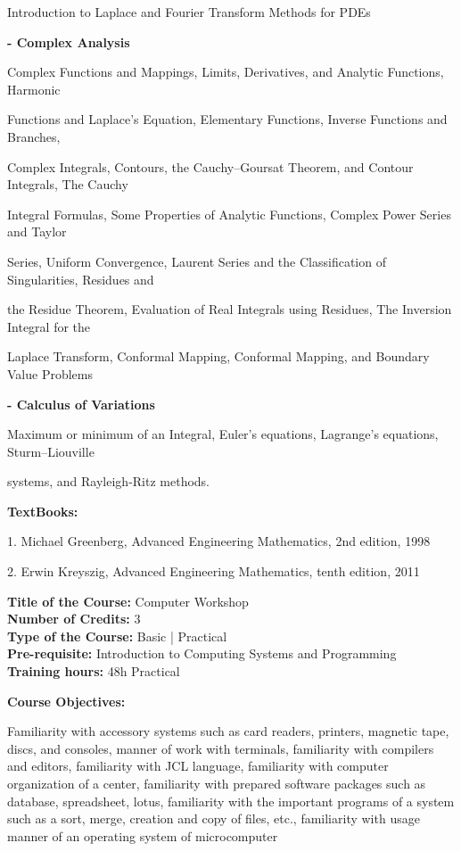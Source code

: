 \documentclass[12pt,a4paper]{article}
\begin{document}
Introduction to Laplace and Fourier Transform Methods for PDEs\par
\vspace{2pt}\textbf{- Complex Analysis}\par
Complex Functions and Mappings, Limits, Derivatives, and Analytic Functions, Harmonic\par
Functions and Laplace’s Equation, Elementary Functions, Inverse Functions and Branches,\par
Complex Integrals, Contours, the Cauchy–Goursat Theorem, and Contour Integrals, The Cauchy\par
Integral Formulas, Some Properties of Analytic Functions, Complex Power Series and Taylor\par
Series, Uniform Convergence, Laurent Series and the Classiﬁcation of Singularities, Residues and\par
the Residue Theorem, Evaluation of Real Integrals using Residues, The Inversion Integral for the\par
Laplace Transform, Conformal Mapping, Conformal Mapping, and Boundary Value Problems\par
\vspace{2pt}\textbf{- Calculus of Variations}\par
Maximum or minimum of an Integral, Euler’s equations, Lagrange’s equations, Sturm–Liouville\par
systems, and Rayleigh-Ritz methods.\par\vspace{4pt}
\textbf{TextBooks:}\par\vspace{2pt}
1. Michael Greenberg, Advanced Engineering Mathematics, 2nd edition, 1998\par
2. Erwin Kreyszig, Advanced Engineering Mathematics, tenth edition, 2011\par
\vspace{4pt}

\newpage
\textbf{Title of the Course:} Computer Workshop\\
\textbf{Number of Credits:} 3\\
\textbf{Type of the Course:} Basic | Practical\\
\textbf{Pre-requisite:} Introduction to Computing Systems and Programming\\
\textbf{Training hours:} 48h Practical\par\vspace{4pt}
\textbf{Course Objectives:}\par\vspace{2pt}
Familiarity with accessory systems such as card readers, printers, magnetic tape, discs, and
consoles, manner of work with terminals, familiarity with compilers and editors, familiarity with
JCL language, familiarity with computer organization of a center, familiarity with prepared
software packages such as database, spreadsheet, lotus, familiarity with the important programs of
a system such as a sort, merge, creation and copy of files, etc., familiarity with usage manner of
an operating system of microcomputer\par\vspace{4pt}
\end{document}
